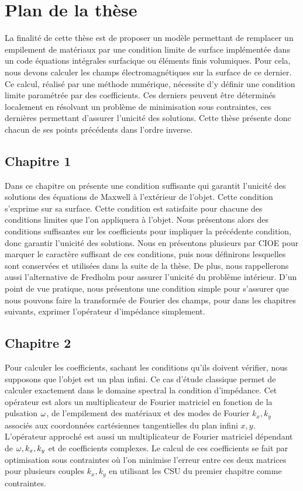 \section*{Plan de la thèse}

La finalité de cette thèse est de proposer un modèle permettant de remplacer un empilement de matériaux par une condition limite de surface implémentée dans un code équations intégrales surfacique ou éléments finis volumiques. Pour cela, nous devons calculer les champs électromagnétiques sur la surface de ce dernier. Ce calcul, réalisé par une méthode numérique, nécessite d'y définir une condition limite paramétrée par des coefficients. Ces derniers peuvent être déterminés localement en résolvant un problème de minimisation sous contraintes, ces dernières permettant d'assurer l'unicité des solutions. Cette thèse présente donc chacun de ses points précédents dans l'ordre inverse.

\subsection*{Chapitre 1}
Dans ce chapitre on présente une condition suffisante qui garantit l'unicité des solutions des équations de Maxwell à l'extérieur de l'objet.
Cette condition s'exprime sur sa surface. Cette condition est satisfaite pour chacune des conditions limites que l'on appliquera à l'objet. Nous présentons alors des conditions suffisantes sur les coefficients pour impliquer la précédente condition, donc garantir l'unicité des solutions.
Nous en présentons plusieurs par CIOE pour marquer le caractère suffisant de ces conditions, puis nous définirons lesquelles sont conservées et utilisées dans la suite de la thèse.
De plus, nous rappellerons aussi l'alternative de Fredholm pour assurer l'unicité du problème intérieur. D'un point de vue pratique, nous présentons une condition simple pour s'assurer que nous pouvons faire la transformée de Fourier des champs, pour dans les chapitres suivants, exprimer l'opérateur d'impédance simplement.

\subsection*{Chapitre 2}
Pour calculer les coefficients, sachant les conditions qu'ils doivent vérifier, nous supposons que l'objet est un plan infini. Ce cas d'étude classique permet de calculer exactement dans le domaine spectral la condition d’impédance. 
Cet opérateur est alors un multiplicateur de Fourier matriciel en fonction de la pulsation \(\omega\), de l'empilement des matériaux et des modes de Fourier \(k_x, k_y\) associés aux coordonnées cartésiennes tangentielles du plan infini \(x,y\).
L'opérateur approché est aussi un multiplicateur de Fourier matriciel dépendant de \(\omega, k_x, k_y\) et de coefficients complexes.
Le calcul de ces coefficients se fait par optimisation sous contraintes où l'on minimise l'erreur entre ces deux matrices pour plusieurs couples \(k_x,k_y\) en utilisant les CSU du premier chapitre comme contraintes.

